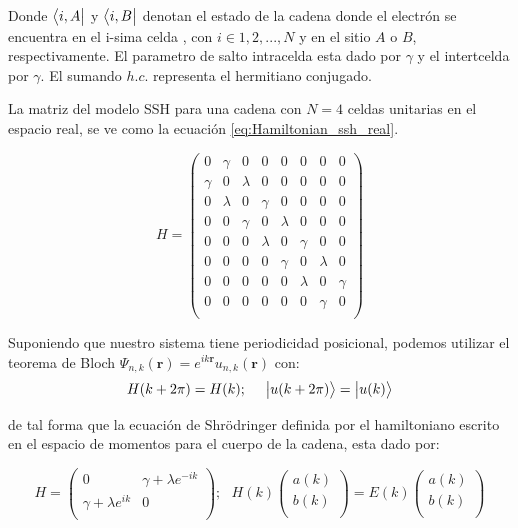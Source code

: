 Donde $\big \langle{i,A}\big |$ y $\big \langle{i,B}\big |$ denotan el estado de la cadena donde el electrón se encuentra en el i-sima celda , con $i \in {1,2,...,N}$ y en el sitio $A$ o $B$, respectivamente. El parametro de salto intracelda esta dado por $\gamma$ y el intertcelda por $\gamma$. El sumando $h.c.$ representa el hermitiano conjugado.

La matriz del modelo SSH para una cadena con $N = 4$ celdas unitarias en el espacio real, se ve como la ecuación \ref{eq:Hamiltonian_ssh_real}.

\begin{equation}
    \label{eq:Hamiltonian_ssh_real}
    H = 
     \begin{pmatrix}
            0 & \gamma & 0 & 0 & 0 & 0 & 0 & 0 \\
            \gamma & 0 & \lambda & 0 & 0 & 0 & 0 & 0 \\
            0 & \lambda & 0 & \gamma & 0 & 0 & 0 & 0 \\
            0 & 0 & \gamma & 0 & \lambda & 0 & 0 & 0 \\
            0 & 0 & 0 & \lambda & 0 & \gamma & 0 & 0 \\
            0 & 0 & 0 & 0 & \gamma & 0 & \lambda & 0 \\
            0 & 0 & 0 & 0 & 0 & \lambda & 0 & \gamma \\
            0 & 0 & 0 & 0 & 0 & 0 & \gamma & 0 \\
            
        \end{pmatrix}
\end{equation}

Suponiendo que nuestro sistema tiene periodicidad posicional, podemos utilizar el teorema de Bloch $\Psi_{n,k}(\mathbf{r}) = e^{i k\mathbf{r}} u_{n,k}(\mathbf{r})$ con:
\begin{equation}
    H(k + 2\pi) = H(k) ; \,\,\,\,\,\,\,\, \big |{u(k + 2\pi)}\big \rangle = \big |{u(k)}\big \rangle 
\end{equation}


de tal forma que la ecuación de Shrödringer definida por el hamiltoniano escrito en el espacio de momentos para el cuerpo de la cadena, esta dado por:

\begin{equation}
    \label{eq:Hamiltonian_ssh_bloch}
    H =      
     \begin{pmatrix}
            0 & \gamma + \lambda e^{-ik}  \\
            \gamma + \lambda e^{ik} & 0  \\
        \end{pmatrix} ; \,\,\,\, H(k) \begin{pmatrix}
            a(k)   \\
            b(k)  \\
        \end{pmatrix} = E(k) \begin{pmatrix}
            a(k)   \\
            b(k)  \\
        \end{pmatrix}
\end{equation}

